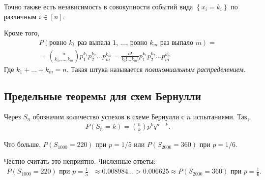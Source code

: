 \begin{prop*}
 Точно также есть независимость в совокупности событий вида $\left\{ x_i = k_i \right\}$  по различным $i \in [n]$. 
\end{prop*}

\begin{prop*}
 Кроме того,
 \begin{align*}
  P(\text{ровно $k_1$ раз выпала $1$, \ldots, ровно $k_m$ раз выпало $m$}) = \\
  = \binom n {k_1,\ldots,k_m} p_1^{k_1} p_2^{k_2} \ldots p_m^{k_m} = \frac{n!}{k_1! \ldots k_m!} p_1^{k_1} p_2^{k_2} \ldots p_m^{k_m}
 \end{align*} Где $k_1 + \dots + k_m = n$. Такая штука называется \textit{полиномиальным распределением}.
\end{prop*}


\subsection{Предельные теоремы для схем Бернулли}

\begin{notatn*}
 Через $S_n$ обозначим количество успехов в схеме Бернулли с $n$ испытаниями. Так,
 \begin{align*}
  P(S_n = k) = \binom n k p^{k} q^{n-k}.
 \end{align*} 
\end{notatn*}

\begin{exmpl*}
 Что больше, $P(S_{1000} = 220)$ при $p = 1 / 5$ или $P(S_{2000} = 360)$ при $p = 1 / 6$.

 Честно считать это неприятно. Численные ответы:
 \begin{align*}
  P(S_{1000} = 220) \text{ при $p = \frac{1}{5}$ } \approx 0.008984\ldots > 0.006625 \approx P(S_{2000} = 360) \text{ при $p = \frac{1}{6}$}
 .\end{align*}
\end{exmpl*}

